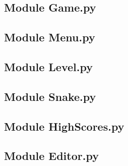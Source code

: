\documentclass[a4paper,11pt]{scrartcl}
\begin{document}
\newpage

\subsection{Module Game.py}

\begin{alltt}

\end{alltt}

\subsection{Module Menu.py}

\begin{alltt}
	
\end{alltt}

\subsection{Module Level.py}
\begin{alltt}
	
\end{alltt}

\subsection{Module Snake.py}
\begin{alltt}
	
\end{alltt}

\subsection{Module HighScores.py}
\begin{alltt}
	
\end{alltt}
\subsection{Module Editor.py}
\begin{alltt}
        
\end{alltt}
\end{document}
